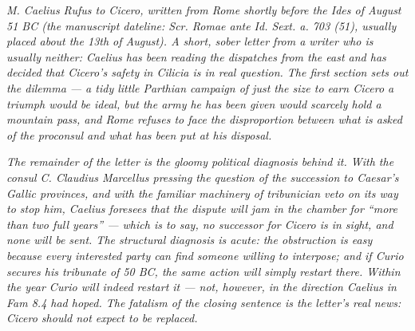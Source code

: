 
\textit{M. Caelius Rufus to Cicero, written from Rome
shortly before the Ides of August 51 BC (the manuscript
dateline: \textit{Scr. Romae ante Id. Sext. a. 703
(51)}, usually placed about the 13th of August). A
short, sober letter from a writer who is usually neither:
Caelius has been reading the dispatches from the east
and has decided that Cicero's safety in Cilicia is in
real question. The first section sets out the
dilemma --- a tidy little Parthian campaign of just the
size to earn Cicero a triumph would be ideal, but the
army he has been given would scarcely hold a mountain
pass, and Rome refuses to face the disproportion
between what is asked of the proconsul and what has
been put at his disposal.}

\textit{The remainder of the letter is the gloomy
political diagnosis behind it. With the consul C.
Claudius Marcellus pressing the question of the
succession to Caesar's Gallic provinces, and with the
familiar machinery of tribunician veto on its way to
stop him, Caelius foresees that the dispute will jam in
the chamber for ``more than two full years'' --- which
is to say, no successor for Cicero is in sight, and
none will be sent. The structural diagnosis is acute:
the obstruction is easy because every interested party
can find someone willing to interpose; and if Curio
secures his tribunate of 50 BC, the same action will
simply restart there. Within the year Curio will indeed
restart it --- not, however, in the direction Caelius
in \textit{Fam} 8.4 had hoped. The fatalism of the
closing sentence is the letter's real news: Cicero
should not expect to be replaced.}
